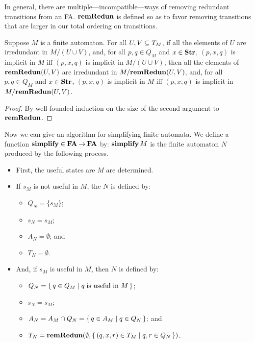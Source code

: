 In general, there are multiple---incompatible---ways of removing
redundant transitions from an FA.  $\mathbf{remRedun}$ is defined so as to
favor removing transitions that are larger in our total ordering on
transitions.

\begin{proposition}
\label{RemRedunFA}
Suppose $M$ is a finite automaton.  For all $U,V\subseteq T_M$, if all the
elements of $U$ are irredundant in $M/(U\cup V)$, and, for all $p,q\in Q_M$
and $x\in\mathbf{Str}$, $(p,x,q)$ is implicit in $M$ iff $(p,x,q)$ is implicit
in $M/(U\cup V)$, then all the elements of $\mathbf{remRedun}(U,V)$ are
irredundant in $M/\mathbf{remRedun}(U,V)$, and, for all $p,q\in Q_M$ and
$x\in\mathbf{Str}$, $(p,x,q)$ is implicit in $M$ iff $(p,x,q)$ is implicit in
$M/\mathbf{remRedun}(U,V)$.
\end{proposition}

\begin{proof}
By well-founded induction on the size of the second argument to
$\mathbf{remRedun}$.
\end{proof}

Now we can give an algorithm for simplifying finite automata.
We define a function $\mathbf{simplify}\in\mathbf{FA}\mathbin{\to}\mathbf{FA}$ by: $\mathbf{simplify}\,M$ is
%
%
%
the finite automaton $N$ produced by the following process.
\begin{itemize}
\item First, the useful states are $M$ are determined.

\item If $s_M$ is not useful in $M$, the $N$ is defined by:
\begin{itemize}
\item $Q_N=\{s_M\}$;

\item $s_N = s_M$;

\item $A_N=\emptyset$; and

\item $T_N=\emptyset$.
\end{itemize}

\item And, if $s_M$ is useful in $M$, then $N$ is defined by:
\begin{itemize}
\item $Q_N=\{ \, q\in Q_M \mid q\;\allowbreak\mbox{is useful in $M$}\allowbreak \, \}$;

\item $s_N = s_M$;

\item $A_N=A_M\cap Q_N=\{ \, q\in A_M \mid q\in Q_N \, \}$; and

\item $T_N=\mathbf{remRedun}(\emptyset, \{ \, (q, x, r)\in T_M \mid q,r\in Q_N \, \})$.
\end{itemize}
\end{itemize}

